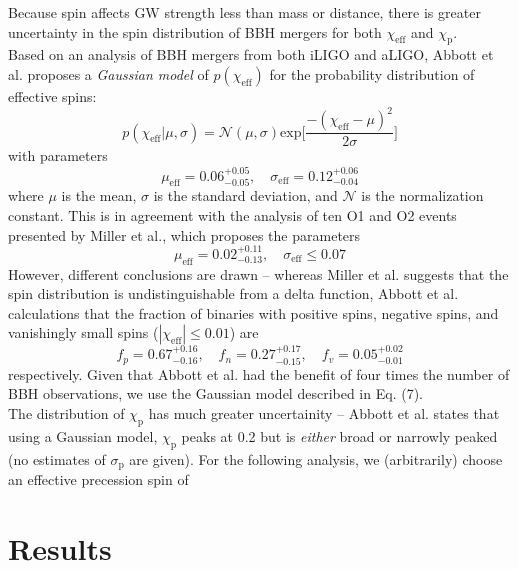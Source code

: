 \documentclass{article}
\begin{document}
Because spin affects GW strength less than mass or distance, there is greater uncertainty in the spin distribution of BBH mergers for both $\chi_\text{eff}$ and $\chi_\text{p}$. \\

Based on an analysis of BBH mergers from both iLIGO and aLIGO, Abbott et al. proposes a \textit{Gaussian model} of $p(\chi_\text{eff})$ for the probability distribution of effective spins:
\begin{equation}
    p(\chi_\text{eff} | \mu, \sigma) = \mathcal{N} (\mu, \sigma) \text{exp} \Big[ \frac{-(\chi_\text{eff} - \mu)^2}{2\sigma} \Big]
\end{equation}
with parameters
\begin{equation}
    \mu_\text{eff} = 0.06_{-0.05}^{+0.05}, \quad \sigma_\text{eff} = 0.12_{-0.04}^{+0.06}
\end{equation}
where $\mu$ is the mean, $\sigma$ is the standard deviation, and $\mathcal{N}$ is the normalization constant. This is in agreement with the analysis of ten O1 and O2 events presented by Miller et al., which proposes the parameters
\begin{equation}
    \mu_\text{eff} = 0.02_{-0.13}^{+0.11}, \quad \sigma_\text{eff} \leq 0.07
\end{equation}
However, different conclusions are drawn -- whereas Miller et al. suggests that the spin distribution is undistinguishable from a delta function, Abbott et al. calculations that the fraction of binaries with positive spins, negative spins, and vanishingly small spins ($|\chi_\text{eff}| \leq 0.01$) are
\begin{equation}
    f_p = 0.67_{-0.16}^{+0.16}, \quad f_n = 0.27_{-0.15}^{+0.17}, \quad f_v = 0.05_{-0.01}^{+0.02}
\end{equation}
respectively. Given that Abbott et al. had the benefit of four times the number of BBH observations, we use the Gaussian model described in Eq. (7). \\

The distribution of $\chi_\text{p}$ has much greater uncertainity -- Abbott et al. states that using a Gaussian model, $\chi_\text{p}$ peaks at 0.2 but is \textit{either} broad or narrowly peaked (no estimates of $\sigma_\text{p}$ are given). For the following analysis, we (arbitrarily) choose an effective precession spin of 

\section{Results}
\end{document}
